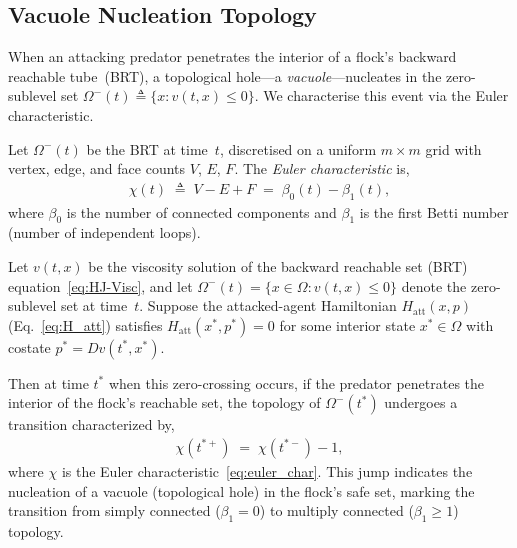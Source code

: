 
\subsection{Vacuole Nucleation Topology}
\label{sec:d38_vacuole}

When an attacking predator penetrates the interior of a flock's backward
reachable tube~(BRT), a topological hole---a \emph{vacuole}---nucleates in
the zero-sublevel set $\Omega^{-}(t) \triangleq \{x : v(t,x) \leq 0\}$.
We characterise this event via the Euler characteristic.

\begin{definition}
\label{def:euler_char}
Let $\Omega^{-}(t)$ be the BRT at time~$t$, discretised on a uniform
$m\times m$ grid with vertex, edge, and face counts $V$, $E$, $F$.  The
\emph{Euler characteristic} is,
%
\begin{align}
\label{eq:euler_char}
\chi(t) \;\triangleq\; V - E + F \;=\; \beta_0(t) - \beta_1(t),
\end{align}
%
where $\beta_0$ is the number of connected components and $\beta_1$ is the
first Betti number (number of independent loops).
\end{definition}

\begin{theorem}
\label{thm:vacuole_nucleation}
Let $v(t, x)$ be the viscosity solution of the backward reachable set (BRT)
equation~\eqref{eq:HJ-Visc}, and let $\Omega^{-}(t) = \{x \in \Omega : v(t,x) \leq 0\}$
denote the zero-sublevel set at time~$t$. Suppose the attacked-agent Hamiltonian
$H_{\mathrm{att}}(x, p)$ (Eq.~\eqref{eq:H_att}) satisfies $H_{\mathrm{att}}(x^*, p^*) = 0$
for some interior state $x^* \in \Omega$ with costate $p^* = Dv(t^*, x^*)$.

Then at time $t^*$ when this zero-crossing occurs, if the predator penetrates
the interior of the flock's reachable set, the topology of $\Omega^{-}(t^*)$
undergoes a transition characterized by,
%
\begin{align}
\label{eq:vacuole_threshold}
\chi(t^{*+}) \;=\; \chi(t^{*-}) - 1,
\end{align}
%
where $\chi$ is the Euler characteristic~\eqref{eq:euler_char}. This jump
indicates the nucleation of a vacuole (topological hole) in the flock's safe set,
marking the transition from simply connected ($\beta_1 = 0$) to multiply connected
($\beta_1 \geq 1$) topology.
\end{theorem}

